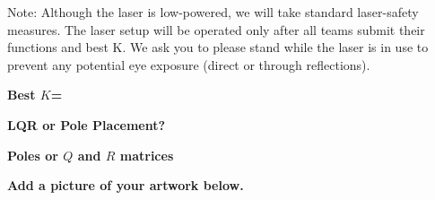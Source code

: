 \documentclass[11pt]{article}
\begin{document}
Note: Although the laser is low-powered, we will take standard laser-safety measures. The laser setup will be operated only after all teams submit their functions and best K. We ask you to please stand while the laser is in use to prevent any potential eye exposure (direct or through reflections).

\vspace{1cm}

 \textbf{Best \( K \)=}\\
\vspace{1cm} %

\textbf{LQR or Pole Placement?}\\

\vspace{0.5 cm} %

\textbf{Poles or \( Q \) and \( R \) matrices\\}

\vspace{2cm} %


\clearpage


\textbf{Add a picture of your artwork below.}\\

  
\end{document}
